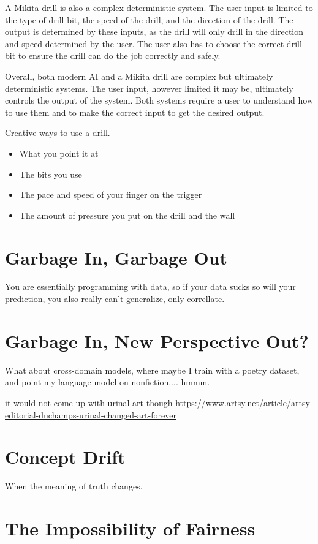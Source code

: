 A Mikita drill is also a complex deterministic system. The user input is limited to the type of drill bit, the speed of the drill, and the direction of the drill. The output is determined by these inputs, as the drill will only drill in the direction and speed determined by the user. The user also has to choose the correct drill bit to ensure the drill can do the job correctly and safely.

Overall, both modern AI and a Mikita drill are complex but ultimately deterministic systems. The user input, however limited it may be, ultimately controls the output of the system. Both systems require a user to understand how to use them and to make the correct input to get the desired output.

Creative ways to use a drill.
\begin{itemize}
\item What you point it at
\item The bits you use
\item The pace and speed of your finger on the trigger
\item The amount of pressure you put on the drill and the wall
\end{itemize}


\section{Garbage In, Garbage Out}

You are essentially programming with data, so if your data sucks so will your prediction, you also really can't generalize, only correllate.

\section{Garbage In, New Perspective Out?}

What about cross-domain models, where maybe I train with a poetry dataset, and point my language model on nonfiction.... hmmm.

it would not come up with urinal art though \url{https://www.artsy.net/article/artsy-editorial-duchamps-urinal-changed-art-forever}

\section{Concept Drift}

When the meaning of truth changes.

\section{The Impossibility of Fairness}

